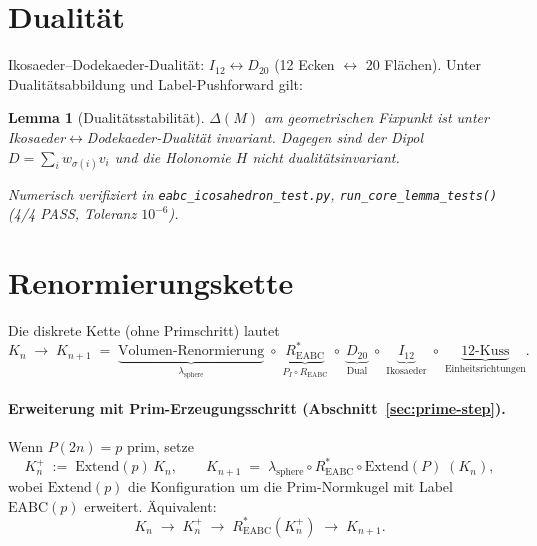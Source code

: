\documentclass[11pt,a4paper]{article}
\newtheorem{lemma}{Lemma}
\begin{document}
\section{Dualität}

Ikosaeder--Dodekaeder-Dualität: $I_{12}\leftrightarrow D_{20}$ (12 Ecken $\leftrightarrow$ 20 Flächen).
Unter Dualitätsabbildung und Label-Pushforward gilt:

\begin{lemma}[Dualitätsstabilität]
$\Delta(M)$ am geometrischen Fixpunkt ist unter Ikosaeder$\leftrightarrow$Dodekaeder-Dualität
invariant. Dagegen sind der Dipol $D=\sum_i w_{\sigma(i)} v_i$ und die Holonomie $H$
\emph{nicht} dualitätsinvariant.
\end{lemma}

\smallskip\noindent
\textit{Numerisch verifiziert in \texttt{eabc\_icosahedron\_test.py},
\texttt{run\_core\_lemma\_tests()} (4/4 PASS, Toleranz $10^{-6}$).}

\section{Renormierungskette}

Die diskrete Kette (ohne Primschritt) lautet
\[
  K_n \;\longrightarrow\; K_{n+1}
  \;=\;
  \underbrace{\text{Volumen-Renormierung}}_{\lambda_{\mathrm{sphere}}}
  \;\circ\;
  \underbrace{R^*_{\mathrm{EABC}}}_{P_I \circ R_{\mathrm{EABC}}}
  \;\circ\;
  \underbrace{D_{20}}_{\text{Dual}}
  \;\circ\;
  \underbrace{I_{12}}_{\text{Ikosaeder}}
  \;\circ\;
  \underbrace{\text{12-Kuss}}_{\text{Einheitsrichtungen}}.
\]

\paragraph{Erweiterung mit Prim-Erzeugungsschritt (Abschnitt~\ref{sec:prime-step}).}
Wenn $P(2n)=p$ prim, setze
\[
  K_n^+ \;:=\; \mathrm{Extend}(p)\,K_n,
  \qquad
  K_{n+1}
  \;=\;
  \lambda_{\mathrm{sphere}}
  \circ R^*_{\mathrm{EABC}}
  \circ \mathrm{Extend}(P)
  \;(K_n),
\]
wobei $\mathrm{Extend}(p)$ die Konfiguration um die Prim-Normkugel mit
Label $\mathrm{EABC}(p)$ erweitert.
Äquivalent:
\[
  K_n \;\longrightarrow\; K_n^+ \;\longrightarrow\;
  R^*_{\mathrm{EABC}}(K_n^+) \;\longrightarrow\; K_{n+1}.
\]
\end{document}
